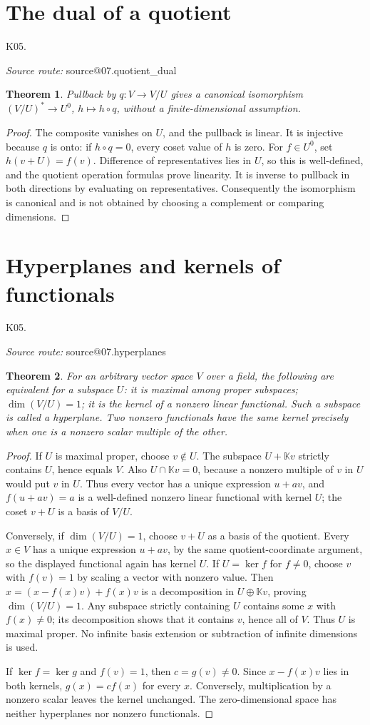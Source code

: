 \documentclass[11pt,a4paper]{book}
\makeatletter
\newtheorem{theorem}{Theorem}[chapter]
\theoremstyle{definition}\newtheorem{definition}[theorem]{Definition}
\theoremstyle{remark}\newtheorem{remark}[theorem]{Remark}
\newcommand{\K}{\mathbb K}\newcommand{\R}{\mathbb R}\newcommand{\C}{\mathbb C}
\newcommand{\Kentry}[2]{\section{#2}\label{k:#1}\noindent\textsf{\small K05.\detokenize{#1}}\par
  \begingroup\small\color{black!65}\textit{Source route: }\csname source@#1\endcsname\par\endgroup}
\makeatother
\begin{document}
\Kentry{07.quotient_dual}{The dual of a quotient}
\begin{theorem}
Pullback by $q:V\to V/U$ gives a canonical isomorphism $(V/U)^*\to U^0$, $h\mapsto h\circ q$, without a finite-dimensional assumption.
\end{theorem}
\begin{proof}
The composite vanishes on $U$, and the pullback is linear. It is injective because $q$ is onto: if $h\circ q=0$, every coset value of $h$ is zero. For $f\in U^0$, set $h(v+U)=f(v)$. Difference of representatives lies in $U$, so this is well-defined, and the quotient operation formulas prove linearity. It is inverse to pullback in both directions by evaluating on representatives. Consequently the isomorphism is canonical and is not obtained by choosing a complement or comparing dimensions.
\end{proof}

\Kentry{07.hyperplanes}{Hyperplanes and kernels of functionals}
\begin{theorem}
For an arbitrary vector space $V$ over a field, the following are equivalent for a subspace $U$: it is maximal among proper subspaces; $\dim(V/U)=1$; it is the kernel of a nonzero linear functional. Such a subspace is called a hyperplane. Two nonzero functionals have the same kernel precisely when one is a nonzero scalar multiple of the other.
\end{theorem}
\begin{proof}
If $U$ is maximal proper, choose $v\notin U$. The subspace $U+\K v$ strictly contains $U$, hence equals $V$. Also $U\cap\K v=0$, because a nonzero multiple of $v$ in $U$ would put $v$ in $U$. Thus every vector has a unique expression $u+av$, and $f(u+av)=a$ is a well-defined nonzero linear functional with kernel $U$; the coset $v+U$ is a basis of $V/U$.

Conversely, if $\dim(V/U)=1$, choose $v+U$ as a basis of the quotient. Every $x\in V$ has a unique expression $u+av$, by the same quotient-coordinate argument, so the displayed functional again has kernel $U$. If $U=\ker f$ for $f\ne0$, choose $v$ with $f(v)=1$ by scaling a vector with nonzero value. Then $x=(x-f(x)v)+f(x)v$ is a decomposition in $U\oplus\K v$, proving $\dim(V/U)=1$. Any subspace strictly containing $U$ contains some $x$ with $f(x)\ne0$; its decomposition shows that it contains $v$, hence all of $V$. Thus $U$ is maximal proper. No infinite basis extension or subtraction of infinite dimensions is used.

If $\ker f=\ker g$ and $f(v)=1$, then $c=g(v)\ne0$. Since $x-f(x)v$ lies in both kernels, $g(x)=c f(x)$ for every $x$. Conversely, multiplication by a nonzero scalar leaves the kernel unchanged. The zero-dimensional space has neither hyperplanes nor nonzero functionals.
\end{proof}
\end{document}
